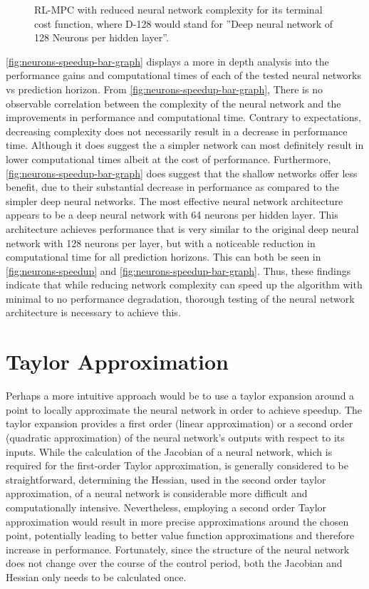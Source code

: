 \begin{figure}[H]
	\centering
	\caption{RL-MPC with reduced neural network complexity for its terminal cost function, where D-128 would stand for ''Deep neural network of 128 Neurons per hidden layer''.}
	\label{fig:neurons-speedup-bar-graph}
\end{figure}
\autoref{fig:neurons-speedup-bar-graph} displays a more in depth analysis into the performance gains and computational times of each of the tested neural networks vs prediction horizon. From \autoref{fig:neurons-speedup-bar-graph}, There is no observable correlation between the complexity of the neural network and the improvements in performance and computational time. Contrary to expectations, decreasing complexity does not necessarily result in a decrease in performance time. Although it does suggest the a simpler network can most definitely result in lower computational times albeit at the cost of performance. Furthermore, \autoref{fig:neurons-speedup-bar-graph} does suggest that the shallow networks offer less benefit, due to their substantial decrease in performance as compared to the simpler deep neural networks. The most effective neural network architecture appears to be a deep neural network with 64 neurons per hidden layer. This architecture achieves performance that is very similar to the original deep neural network with 128 neurons per layer, but with a noticeable reduction in computational time for all prediction horizons. This can both be seen in \autoref{fig:neurons-speedup} and \autoref{fig:neurons-speedup-bar-graph}. Thus, these findings indicate that while reducing network complexity can speed up the algorithm with minimal to no performance degradation, thorough testing of the neural network architecture is necessary to achieve this.



\section{Taylor Approximation}
Perhaps a more intuitive approach would be to use a taylor expansion around a point to locally approximate the neural network in order to achieve speedup. The taylor expansion provides a  first order (linear approximation) or a second order (quadratic approximation) of the neural network's outputs with respect to its inputs. While the calculation of the Jacobian of a neural network, which is required for the first-order Taylor approximation, is generally considered to be straightforward, determining the Hessian, used in the second order taylor approximation, of a neural network is considerable more difficult and computationally intensive. Nevertheless, employing a second order Taylor approximation would result in more precise approximations around the chosen point, potentially leading to better value function approximations and therefore increase in performance. Fortunately, since the structure of the neural network does not change over the course of the control period, both the Jacobian and Hessian only needs to be calculated once. \\

